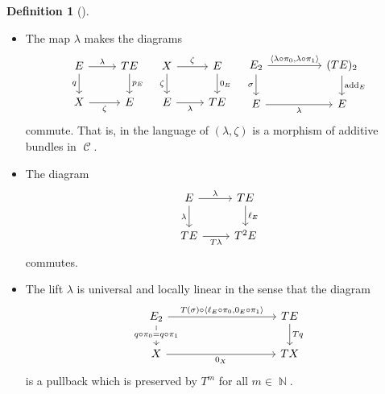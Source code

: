 \documentclass{amsart}
\newtheorem{proposition}[equation]{Proposition}
\theoremstyle{definition}
\newtheorem{definition}[equation]{Definition}
\DeclareMathOperator{\Cscr}{\mathscr{C}}
\DeclareMathOperator{\N}{\mathbb{N}}
\numberwithin{equation}{subsection}
\begin{document}
\begin{definition}[{\cite[Definition 2.3]{GeoffRobinBundle}}]
\begin{itemize}
\[\begin{tikzcd}
		\end{tikzcd}
		\]
		commute. In the language of \cite{GeoffRobinDiffStruct}, $(\lambda,0_X)$ is a morphism of additive bundles in $\Cscr$.
		\item The map $\lambda$ makes the diagrams
		\[
		\begin{tikzcd}
			E \ar[r]{}{\lambda} \ar[d, swap]{}{q} & TE \ar[d]{}{p_E} \\
			X \ar[r, swap]{}{\zeta} & E
		\end{tikzcd}\quad
		\begin{tikzcd}
			X \ar[d, swap]{}{\zeta} \ar[r]{}{\zeta} & E \ar[d]{}{0_E} \\
			E \ar[r,swap]{}{\lambda} & TE
		\end{tikzcd}\quad
		\begin{tikzcd}
			E_2 \ar[rr]{}{\langle \lambda \circ \pi_0, \lambda \circ \pi_1\rangle} \ar[d, swap]{}{\sigma} & & (TE)_2 \ar[d]{}{\operatorname{add}_E} \\
			E \ar[rr, swap]{}{\lambda} & & E
		\end{tikzcd}
		\]
		commute. That is, in the language of \cite{GeoffRobinDiffStruct} $(\lambda,\zeta)$ is a morphism of additive bundles in $\Cscr$.
		\item The diagram
		\[
		\begin{tikzcd}
		E \ar[r]{}{\lambda} \ar[d, swap]{}{\lambda} & TE \ar[d]{}{\ell_E} \\
		TE \ar[r, swap]{}{T\lambda} & T^2E
		\end{tikzcd}
		\]
		commutes.
		\item The lift $\lambda$ is universal and locally linear in the sense that the diagram
		\[
		\begin{tikzcd}
			E_2 \ar[d, swap]{}[description]{q \circ \pi_0 = q \circ \pi_1} \ar[rrrr]{}{T(\sigma) \circ \langle \ell_E \circ \pi_0, 0_E \circ \pi_1 \rangle} & & & & TE \ar[d]{}{Tq} \\
			X \ar[rrrr, swap]{}{0_X} & & & & TX
		\end{tikzcd}
		\]
		is a pullback which is preserved by $T^m$ for all $m \in \N$.
	\end{itemize}
\end{definition}
\end{document}
